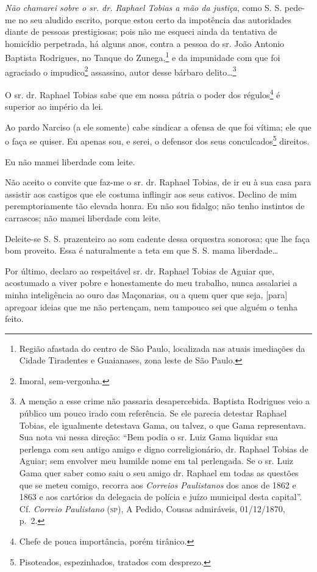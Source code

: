 {\emph{Não chamarei sobre o sr. dr. Raphael Tobias a mão da justiça},
como S. S. pede-me no seu aludido escrito, porque estou certo da
impotência das autoridades diante de pessoas prestigiosas; pois não me
esqueci ainda da tentativa de homicídio perpetrada, há alguns anos,
contra a pessoa do sr. João Antonio Baptista Rodrigues, no Tanque do
Zunega,\footnote{ Região afastada do centro de São Paulo, localizada
  nas atuais imediações da Cidade Tiradentes e Guaianases, zona leste de
  São Paulo.} e da impunidade com que foi agraciado o
impudico\footnote{ Imoral, sem-vergonha.} assassino, autor desse
bárbaro delito\ldots{}\footnote{ A menção a esse crime não passaria
  desapercebida. Baptista Rodrigues veio a público um pouco irado com
  referência. Se ele parecia detestar Raphael Tobias, ele igualmente
  detestava Gama, ou talvez, o que Gama representava. Sua nota vai nessa
  direção: ``Bem podia o sr. Luiz Gama liquidar sua perlenga com seu
  antigo amigo e digno correligionário, dr. Raphael Tobias de Aguiar;
  sem envolver meu humilde nome em tal perlengada. Se o sr. Luiz Gama
  quer saber como saiu o seu amigo dr. Raphael em todas as questões que
  se meteu comigo, recorra aos \emph{Correios Paulistanos} dos anos de
  1862 e 1863 e aos cartórios da delegacia de polícia e juízo municipal
  desta capital''. Cf. \emph{Correio Paulistano} (\textsc{sp}), A Pedido,
  Cousas admiráveis, 01/12/1870, p.~2.}

O sr. dr. Raphael Tobias sabe que em nossa pátria o poder dos
régulos\footnote{ Chefe de pouca importância, porém tirânico.} é
superior ao império da lei.

Ao pardo Narciso (a ele somente) cabe sindicar a ofensa de que foi
vítima; ele que o faça se quiser. Eu apenas sou, e serei, o defensor dos
seus conculcados\footnote{ Pisoteados, espezinhados, tratados com
  desprezo.} direitos.

Eu não mamei liberdade com leite.

Não aceito o convite que faz-me o sr. dr. Raphael Tobias, de ir eu à sua
casa para assistir aos castigos que ele costuma inflingir aos seus
cativos. Declino de mim peremptoriamente tão elevada honra. Eu não sou
fidalgo; não tenho instintos de carrascos; não mamei liberdade com
leite.

Deleite-se S. S. prazenteiro ao som cadente dessa orquestra sonorosa;
que lhe faça bom proveito. Essa é naturalmente a teta em que S. S. mama
liberdade\ldots{}

Por último, declaro ao respeitável sr. dr. Raphael Tobias de Aguiar que,
acostumado a viver pobre e honestamente do meu trabalho, nunca
assalariei a minha inteligência ao ouro das Maçonarias, ou a quem quer
que seja, {[}para{]} apregoar ideias que me não pertençam, nem tampouco
sei que alguém o tenha feito.

}
